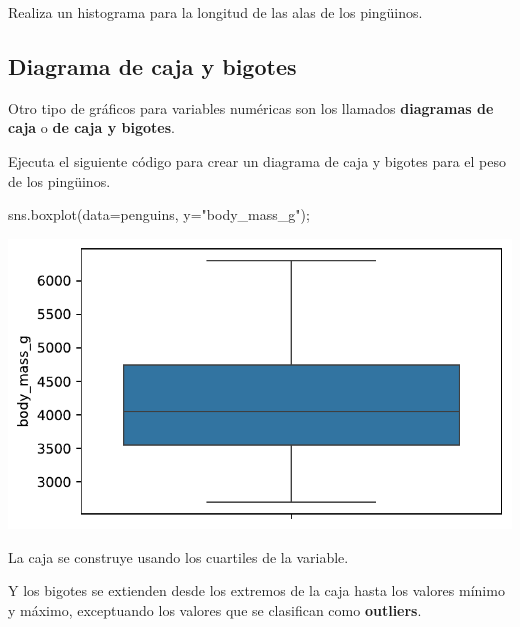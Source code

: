 \documentclass[
  a4paper,
  noprof,
  12pt,
  notoc,
  nosols,
  nobib]{mnye}
\newenvironment{Shaded}{\begin{snugshade}}{\end{snugshade}}
\newcommand{\NormalTok}[1]{\textcolor[rgb]{0.00,0.23,0.31}{#1}}
\newcommand{\OperatorTok}[1]{\textcolor[rgb]{0.37,0.37,0.37}{#1}}
\newcommand{\StringTok}[1]{\textcolor[rgb]{0.13,0.47,0.30}{#1}}
\renewenvironment{exercise}[1][]{
            \if\relax\detokenize{#1}\relax
                \ex
            \else
                \ex[note={#1}]
            \fi
        }{\endex}
\theoremstyle{definition}
\newtheorem{exercise}{Ejercicio}[section]
\theoremstyle{remark}
\begin{document}
\begin{exercise}[]%
\protect\hypertarget{exr-1numerical-histplot}{}\label{exr-1numerical-histplot}%
Realiza un histograma para la longitud de las alas de los pingüinos.

\end{exercise}

\subsection{Diagrama de caja y bigotes}\label{sec-1numerical-boxplot}

Otro tipo de gráficos para variables numéricas son los llamados
\textbf{diagramas de caja} o \textbf{de caja y bigotes}.

Ejecuta el siguiente código para crear un diagrama de caja y bigotes
para el peso de los pingüinos.

\begin{Shaded}
\begin{Highlighting}[]
\NormalTok{sns.boxplot(data}\OperatorTok{=}\NormalTok{penguins, y}\OperatorTok{=}\StringTok{"body\_mass\_g"}\NormalTok{)}\OperatorTok{;}
\end{Highlighting}
\end{Shaded}

\includegraphics{chapters/1numerical_files/figure-pdf/cell-6-output-1.pdf}

La caja se construye usando los cuartiles de la variable.

Y los bigotes se extienden desde los extremos de la caja hasta los
valores mínimo y máximo, exceptuando los valores que se clasifican como
\textbf{outliers}.
\end{document}
